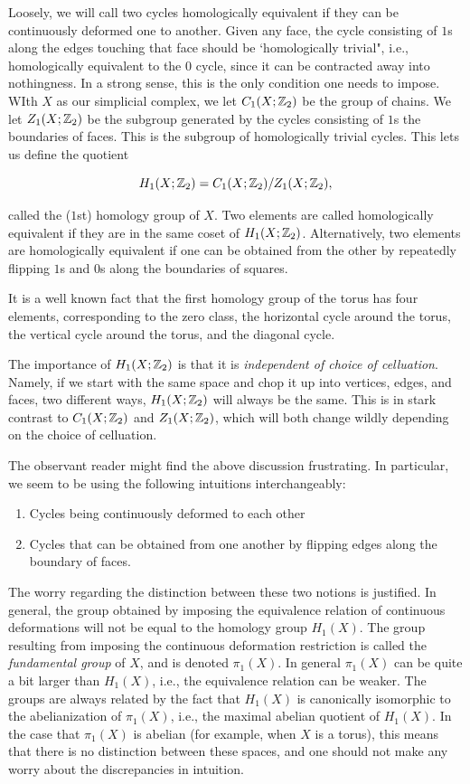 \documentclass{article}
\theoremstyle{definition}
\numberwithin{figure}{section}
\begin{document}
Loosely, we will call two cycles homologically equivalent if they can be continuously deformed one to another. Given any face, the cycle consisting of $1$s along the edges touching that face should be `homologically trivial", i.e., homologically equivalent to the $0$ cycle, since it can be contracted away into nothingness. In a strong sense, this is the only condition one needs to impose. WIth $X$ as our simplicial complex, we let $C_1(X;\mathbb{Z}_2)$ be the group of chains. We let $Z_1(X;\mathbb{Z}_2)$ be the subgroup generated by the cycles consisting of $1$s  the boundaries of faces. This is the subgroup of homologically trivial cycles. This lets us define the quotient

$$H_1(X;\mathbb{Z}_2)=C_1(X;\mathbb{Z}_2)/Z_1(X;\mathbb{Z}_2),$$

called the ($1$st) homology group of $X$. Two elements are called homologically equivalent if they are in the same coset of $H_1(X;\mathbb{Z}_2)$. Alternatively, two elements are homologically equivalent if one can be obtained from the other by repeatedly flipping $1$s and $0$s along the boundaries of squares.

It is a well known fact that the first homology group of the torus has four elements, corresponding to the zero class, the horizontal cycle around the torus, the vertical cycle around the torus, and the diagonal cycle.

The importance of $H_1(X;\mathbb{Z}_2)$ is that it is \textit{independent of choice of celluation}. Namely, if we start with the same space and chop it up into vertices, edges, and faces, two different ways, $H_1(X;\mathbb{Z}_2)$ will always be the same. This is in stark contrast to $C_1(X;\mathbb{Z}_2)$ and $Z_1(X;\mathbb{Z}_2)$, which will both change wildly depending on the choice of celluation.

The observant reader might find the above discussion frustrating. In particular, we seem to be using the following intuitions interchangeably:

\begin{enumerate}
\item Cycles being continuously deformed to each other
\item Cycles that can be obtained from one another by flipping edges along the boundary of faces.
\end{enumerate}

The worry regarding the distinction between these two notions is justified. In general, the group obtained by imposing the equivalence relation of continuous deformations will not be equal to the homology group $H_1(X)$. The group resulting from imposing the continuous deformation restriction is called the \textit{fundamental group} of $X$, and is denoted $\pi_1(X)$. In general $\pi_1(X)$ can be quite a bit larger than $H_1(X)$, i.e., the equivalence relation can be weaker. The groups are always related by the fact that $H_1(X)$ is canonically isomorphic to the abelianization of $\pi_1(X)$, i.e., the maximal abelian quotient of $H_1(X)$. In the case that $\pi_1(X)$ is abelian (for example, when $X$ is a torus), this means that there is no distinction between these spaces, and one should not make any worry about the discrepancies in intuition.
\end{document}
